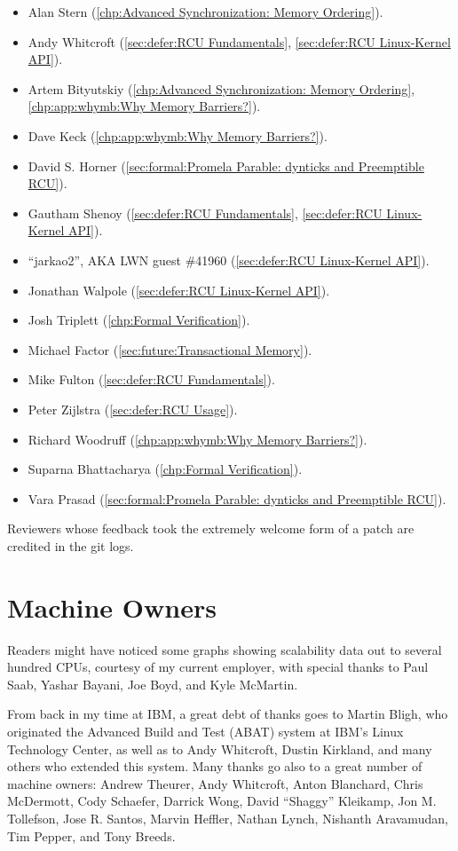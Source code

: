 \begin{itemize}
\item	Alan Stern (\cref{chp:Advanced Synchronization: Memory Ordering}).
\item	Andy Whitcroft (\cref{sec:defer:RCU Fundamentals},
	\cref{sec:defer:RCU Linux-Kernel API}).
\item	Artem Bityutskiy (\cref{chp:Advanced Synchronization: Memory Ordering},
	\cref{chp:app:whymb:Why Memory Barriers?}).
\item	Dave Keck (\cref{chp:app:whymb:Why Memory Barriers?}).
\item	David S. Horner
	(\cref{sec:formal:Promela Parable: dynticks and Preemptible RCU}).
\item	Gautham Shenoy (\cref{sec:defer:RCU Fundamentals},
	\cref{sec:defer:RCU Linux-Kernel API}).
\item	``jarkao2'', AKA LWN guest \#41960 (\cref{sec:defer:RCU Linux-Kernel API}).
\item	Jonathan Walpole (\cref{sec:defer:RCU Linux-Kernel API}).
\item	Josh Triplett (\cref{chp:Formal Verification}).
\item	Michael Factor (\cref{sec:future:Transactional Memory}).
\item	Mike Fulton (\cref{sec:defer:RCU Fundamentals}).
\item	Peter Zijlstra
	(\cref{sec:defer:RCU Usage}). %
\item	Richard Woodruff (\cref{chp:app:whymb:Why Memory Barriers?}).
\item	Suparna Bhattacharya (\cref{chp:Formal Verification}).
\item	Vara Prasad
	(\cref{sec:formal:Promela Parable: dynticks and Preemptible RCU}).
\end{itemize}

Reviewers whose feedback took the extremely welcome form of a patch
are credited in the git logs.

\section{Machine Owners}

Readers might have noticed some graphs showing scalability data out
to several hundred CPUs, courtesy of my current employer, with special
thanks to Paul Saab, Yashar Bayani, Joe Boyd, and Kyle McMartin.

From back in my time at IBM,
a great debt of thanks goes to Martin Bligh, who originated the
Advanced Build and Test (ABAT) system at IBM's Linux Technology
Center, as well as to Andy Whitcroft, Dustin Kirkland, and many
others who extended this system.
Many thanks go also to a great number of machine owners:
Andrew Theurer,
Andy Whitcroft,
Anton Blanchard,
Chris McDermott,
Cody Schaefer,
Darrick Wong,
David ``Shaggy'' Kleikamp,
Jon M. Tollefson,
Jose R. Santos,
Marvin Heffler,
Nathan Lynch,
Nishanth Aravamudan,
Tim Pepper,
and
Tony Breeds.


